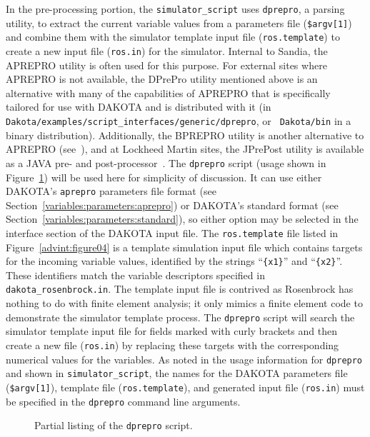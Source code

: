 In the pre-processing portion, the \texttt{simulator\_script} uses
\texttt{dprepro}, a parsing utility, to extract the
current variable values from a parameters file (\texttt{\$argv[1]})
and combine them with the simulator template input file
(\texttt{ros.template}) to create a new input file (\texttt{ros.in})
for the simulator. Internal to Sandia, the APREPRO utility is often
used for this purpose. For external sites where APREPRO is not
available, the DPrePro utility mentioned above is an alternative with
many of the capabilities of APREPRO that is specifically tailored for
use with DAKOTA and is distributed with it (in
\\ \texttt{Dakota/examples/script\_interfaces/generic/dprepro}, or {\tt
Dakota/bin} in a binary distribution).  Additionally, the BPREPRO
utility is another alternative to APREPRO (see~\cite{WalXX}), and at
Lockheed Martin sites, the JPrePost utility is available as a JAVA
pre- and post-processor~\cite{Fla}.  The \texttt{dprepro} script
(usage shown in Figure~\ref{advint:figure03}) will be used here for
simplicity of discussion. It can use either DAKOTA's \texttt{aprepro}
parameters file format (see
Section~\ref{variables:parameters:aprepro}) or DAKOTA's standard
format (see Section~\ref{variables:parameters:standard}), so either
option may be selected in the interface section of the DAKOTA input
file. The \texttt{ros.template} file listed in
Figure~\ref{advint:figure04} is a template simulation input file which
contains targets for the incoming variable values, identified by the
strings ``\texttt{\{x1\}}'' and ``\texttt{\{x2\}}''.  These
identifiers match the variable descriptors specified in
\texttt{dakota\_rosenbrock.in}. The template input file is contrived
as Rosenbrock has nothing to do with finite element analysis; it only
mimics a finite element code to demonstrate the simulator
template process. The \texttt{dprepro} script will search the
simulator template input file for fields marked with curly
brackets and then create a new file (\texttt{ros.in}) by replacing
these targets with the corresponding numerical values for the
variables.  As noted in the usage information for \texttt{dprepro} and
shown in \texttt{simulator\_script}, the names for the DAKOTA
parameters file (\texttt{\$argv[1]}), template file
(\texttt{ros.template}), and generated input file (\texttt{ros.in})
must be specified in the \texttt{dprepro} command line arguments.

\begin{figure}
  \centering
  \begin{bigbox}
    \begin{small}
    \end{small}
  \end{bigbox}
  \caption{Partial listing of the \texttt{dprepro} script.}
  \label{advint:figure03}
\end{figure}

